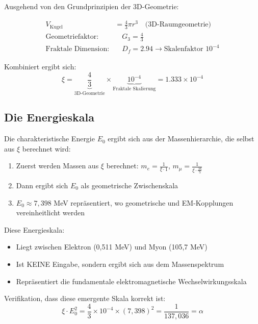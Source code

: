 \documentclass[12pt,a4paper]{article}
\theoremstyle{definition}
\begin{document}
	Ausgehend von den Grundprinzipien der 3D-Geometrie:
	
\begin{align}
	V_{\text{Kugel}} &= \frac{4}{3}\pi r^3 \quad \text{(3D-Raumgeometrie)}\\
	\text{Geometriefaktor:} & \quad G_3 = \frac{4}{3}\\
	\text{Fraktale Dimension:} & \quad D_f = 2.94 \rightarrow \text{Skalenfaktor } 10^{-4}
\end{align}

Kombiniert ergibt sich:
\begin{equation}
	\xi = \underbrace{\frac{4}{3}}_{\text{3D-Geometrie}} \times \underbrace{10^{-4}}_{\text{Fraktale Skalierung}} = 1.333 \times 10^{-4}
\end{equation}
	
	\subsection{Die Energieskala}
	
	Die charakteristische Energie $E_0$ ergibt sich aus der Massenhierarchie, die selbst aus $\xi$ berechnet wird:
	
	\begin{enumerate}
		\item Zuerst werden Massen aus $\xi$ berechnet: $m_e = \frac{1}{\xi \cdot 1}$, $m_\mu = \frac{1}{\xi \cdot \frac{16}{5}}$
		\item Dann ergibt sich $E_0$ als geometrische Zwischenskala
		\item $E_0 \approx 7,398$ MeV repräsentiert, wo geometrische und EM-Kopplungen vereinheitlicht werden
	\end{enumerate}
	
	Diese Energieskala:
	\begin{itemize}
		\item Liegt zwischen Elektron (0,511 MeV) und Myon (105,7 MeV)
		\item Ist KEINE Eingabe, sondern ergibt sich aus dem Massenspektrum
		\item Repräsentiert die fundamentale elektromagnetische Wechselwirkungsskala
	\end{itemize}
	
	Verifikation, dass diese emergente Skala korrekt ist:
	\begin{equation}
		\xi \cdot E_0^2 = \frac{4}{3} \times 10^{-4} \times (7,398)^2 = \frac{1}{137,036} = \alpha
	\end{equation}
	
\end{document}
